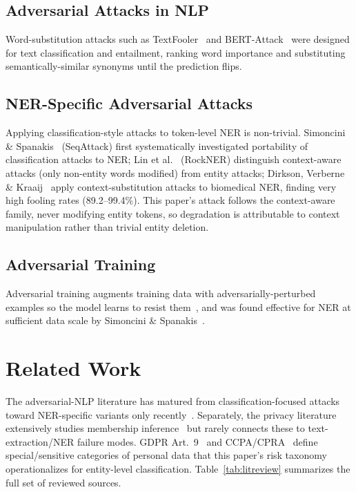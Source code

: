 \documentclass[conference]{IEEEtran}
\begin{document}
\subsection{Adversarial Attacks in NLP}
Word-substitution attacks such as TextFooler~\cite{jin2020bert} and BERT-Attack~\cite{li2020bertattack} were designed for text classification and entailment, ranking word importance and substituting semantically-similar synonyms until the prediction flips.

\subsection{NER-Specific Adversarial Attacks}
Applying classification-style attacks to token-level NER is non-trivial. Simoncini \& Spanakis~\cite{simoncini2021seqattack} (SeqAttack) first systematically investigated portability of classification attacks to NER; Lin et al.~\cite{lin2021rockner} (RockNER) distinguish context-aware attacks (only non-entity words modified) from entity attacks; Dirkson, Verberne \& Kraaij~\cite{dirkson2021breaking} apply context-substitution attacks to biomedical NER, finding very high fooling rates (89.2--99.4\%). This paper's attack follows the context-aware family, never modifying entity tokens, so degradation is attributable to context manipulation rather than trivial entity deletion.

\subsection{Adversarial Training}
Adversarial training augments training data with adversarially-perturbed examples so the model learns to resist them~\cite{madry2018towards}, and was found effective for NER at sufficient data scale by Simoncini \& Spanakis~\cite{simoncini2021seqattack}.

\section{Related Work}
The adversarial-NLP literature has matured from classification-focused attacks~\cite{jin2020bert,li2020bertattack,li2019textbugger} toward NER-specific variants only recently~\cite{simoncini2021seqattack,lin2021rockner,dirkson2021breaking}. Separately, the privacy literature extensively studies membership inference~\cite{shokri2017membership} but rarely connects these to text-extraction/NER failure modes. GDPR Art.~9~\cite{gdpr2016} and CCPA/CPRA~\cite{ccpa2020} define special/sensitive categories of personal data that this paper's risk taxonomy operationalizes for entity-level classification. Table~\ref{tab:litreview} summarizes the full set of reviewed sources.
\end{document}
